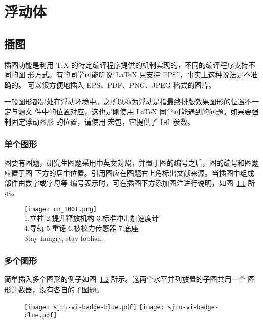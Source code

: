 
\chapter{浮动体}

\section{插图}

插图功能是利用 \TeX{} 的特定编译程序提供的机制实现的，不同的编译程序支持不同的图
形方式。有的同学可能听说“\LaTeX{} 只支持 EPS”，事实上这种说法是不准确的。\XeTeX{}
可以很方便地插入 EPS、PDF、PNG、JPEG 格式的图片。

一般图形都是处在浮动环境中。之所以称为浮动是指最终排版效果图形的位置不一定与源文
件中的位置对应，这也是刚使用 \LaTeX{} 同学可能遇到的问题。如果要强制固定浮动图形
的位置，请使用  宏包，它提供了 \texttt{[H]} 参数。

\subsection{单个图形}

图要有图题，研究生图题采用中英文对照，并置于图的编号之后，图的编号和图题应置于图
下方的居中位置。引用图应在图题右上角标出文献来源。当插图中组成部件由数字或字母等
编号表示时，可在插图下方添加图注进行说明，如图~\ref{fig:cn_100t} 所示。

\begin{figure}[!htp]
  \centering
  \texttt{[image: cn\_100t.png]} \\
    1.立柱 2.提升释放机构 3.标准冲击加速度计 \\
    4.导轨 5.重锤 6.被校力传感器 7.底座 \\
    {Stay hungry, stay foolish.}
  \label{fig:cn_100t}
\end{figure}

\subsection{多个图形}

简单插入多个图形的例子如图~\ref{fig:SRR} 所示。这两个水平并列放置的子图共用一个
图形计数器，没有各自的子图题。

\begin{figure}[!htp]
  \centering
  \texttt{[image: sjtu-vi-badge-blue.pdf]}
  \hspace{1cm}
  \texttt{[image: sjtu-vi-badge-blue.pdf]}
  \label{fig:SRR}
\end{figure}

